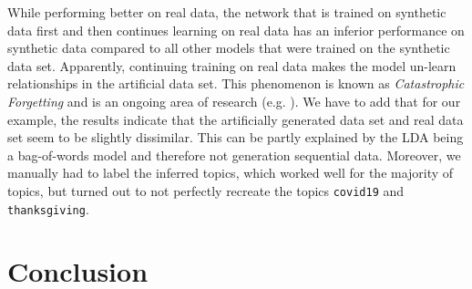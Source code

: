 \documentclass[11pt]{article}
\begin{document}
\noindent While performing better on real data, the network that is trained on synthetic data first and then continues learning on real data has an inferior performance on synthetic data compared to all other models that were trained on the synthetic data set. Apparently, continuing training on real data makes the model un-learn relationships in the artificial data set. This phenomenon is known as \emph{Catastrophic Forgetting} and is an ongoing area of research (e.g. \cite{kaushik2021understanding}). We have to add that for our example, the results indicate that the artificially generated data set and real data set seem to be slightly dissimilar. This can be partly explained by the LDA being a bag-of-words model and therefore not generation sequential data. Moreover, we manually had to label the inferred topics, which worked well for the majority of topics, but turned out to not perfectly recreate the topics \texttt{covid19} and \texttt{thanksgiving}.


\section{Conclusion}


\newpage
\printbibliography
\end{document}
